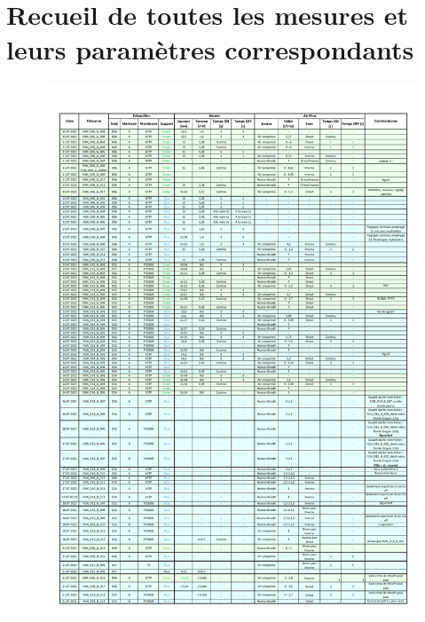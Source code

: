 \documentclass[
    iai & comatec, %
    mi, %
]{heig-tb}
\begin{document}
\section{Recueil de toutes les mesures et leurs paramètres correspondants}
\begin{figure}[H]
    \vspace*{-2cm}
    \includegraphics[scale = 0.85, page = 1]{assets/pdf/Data_descriptions.pdf}
\end{figure}


\let\cleardoublepage\clearpage
\backmatter

\label{index}
\printindex

%
\end{document}
